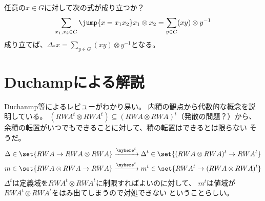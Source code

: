 	\begin{todo}[群の因数分解の列挙]\label{todo:群の因数分解の列挙} %
		任意の$x\in G$に対して次の式が成り立つか？
		\begin{equation*}\begin{split} %
			\sum_{x_1,x_2\in G}\jump{x=x_1x_2}x_1\otimes x_2
			= \sum_{y\in G}(xy)\otimes y^{-1}
		\end{split}\end{equation*} %
		成り立てば、$\Delta_*x=\sum_{y\in G}(xy)\otimes y^{-1}$となる。
	\end{todo} %

\section{Duchampによる解説}\label{s1:Duchampによる解説} %
	Duchanmp等によるレビュー\cite{arxiv:0912.3866}がわかり易い。
	内積の観点から代数的な概念を説明している。
	$(RWA^t\otimes RWA^t)\subseteq (RWA\otimes RWA)^t$（発散の問題？）から、
	余積の転置がいつでもできることに対して、積の転置はできるとは限らない
	そうだ。
	\begin{equation*}\begin{split} %
		\Delta\in\set{RWA\to RWA\otimes RWA} &\xrightarrow{\myhere^t} 
			\Delta^t\in\set{(RWA\otimes RWA)^t\to RWA^t} \\
		m\in\set{RWA\otimes  RWA\to RWA} &\xrightarrow{\myhere^t} 
			m^t\in\set{RWA^t\to (RWA\otimes RWA)^t} \\
	\end{split}\end{equation*} %
	$\Delta^t$は定義域を$RWA^t\otimes RWA^t$に制限すればよいのに対して、
	$m^t$は値域が$RWA^t\otimes RWA^t$をはみ出てしまうので対処できない
	ということらしい。

